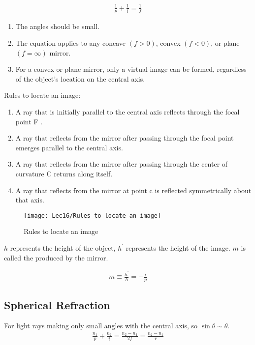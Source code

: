 \begin{align*}
    \frac{1}{p }+\frac{1 }{i }=\frac{1 }{f }
\end{align*}

\begin{enumerate}
    \item The angles should be small. 
    \item The equation applies to any concave $(f > 0)$, convex $(f < 0)$, or plane $(f = \infty )$ mirror.
    \item For a convex or plane mirror, only a virtual image can be formed, regardless of the object’s location on the central axis.
\end{enumerate}

Rules to locate an image: 
\begin{enumerate}
    \item A ray that is initially parallel to the
    central axis reflects through the focal point F . 
    \item A ray that reflects from the mirror after passing through the focal point emerges parallel to the central axis. 
    \item A ray that reflects from the mirror after passing through the center of curvature C returns along itself. 
    \item A ray that reflects from the mirror at point c is reflected symmetrically about that axis.
\end{enumerate}

\begin{figure}[H]
    \centering
    \texttt{[image: Lec16/Rules to locate an image]}
    \caption{Rules to locate an image}
\end{figure}

$h$ represents the height of the object, $h^{\prime}$ represents the height of the image. $m$ is called the  produced by the mirror. 

\begin{align*}
    m \equiv \frac{h^{\prime}}{h} = -\frac{i}{p} 
\end{align*}

\subsection{Spherical Refraction}

For light rays making only small angles with the central axis, so $\sin\theta\sim\theta$. 
\begin{align*}
    \frac{n_1}{p}+\frac{n_2}{i}=\frac{n_2-n_1}{2f}=\frac{n_2-n_1}{r}
\end{align*}

